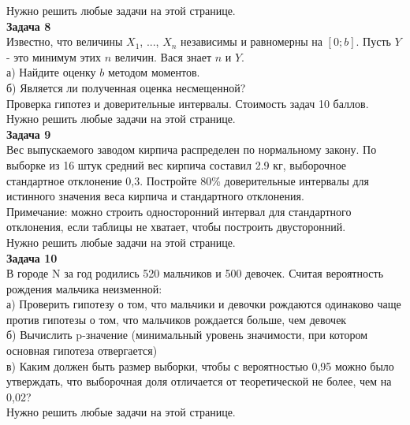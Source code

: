 \documentclass[pdftex,12pt,a4paper]{article}
\begin{document}
Нужно решить любые \textbf{} задачи на этой странице. \\

\textbf{Задача 8} \\
Известно, что величины $X_{1}$, ..., $X_{n}$ независимы и равномерны на $[0;b]$. Пусть $Y$- это минимум этих $n$ величин. Вася знает $n$ и $Y$. \\
а) Найдите оценку $b$ методом моментов. \\
б) Является ли полученная оценка несмещенной? \\



\newpage
Проверка гипотез и доверительные интервалы. Стоимость задач 10 баллов. \\
Нужно решить любые \textbf{} задачи на этой странице. \\

\textbf{Задача 9} \\
Вес выпускаемого заводом кирпича распределен по нормальному закону. По выборке из 16 штук средний вес кирпича составил 2.9 кг, выборочное стандартное отклонение 0,3. Постройте 80\% доверительные интервалы для истинного значения веса кирпича и стандартного отклонения. \\
Примечание: можно строить односторонний интервал для стандартного отклонения, если таблицы не хватает, чтобы построить двусторонний. \\

Нужно решить любые \textbf{} задачи на этой странице. \\

\textbf{Задача 10} \\
В городе N за год родились 520 мальчиков и 500 девочек. Считая вероятность рождения мальчика неизменной: \\
а) Проверить гипотезу о том, что мальчики и девочки рождаются одинаково чаще против гипотезы о том, что мальчиков рождается больше, чем девочек \\
б) Вычислить p-значение (минимальный уровень значимости, при котором основная гипотеза отвергается) \\
в) Каким должен быть размер выборки, чтобы с вероятностью 0,95 можно было утверждать, что выборочная доля отличается от теоретической не более, чем на 0,02? \\

Нужно решить любые \textbf{} задачи на этой странице. \\
\end{document}
